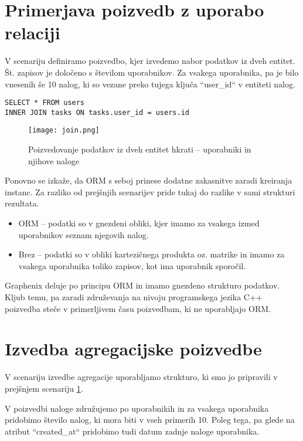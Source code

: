 \documentclass[a4paper,12pt,openright]{book}
\begin{document}
    \section{Primerjava poizvedb z uporabo relaciji}
    \label{join_lbl}

    V scenariju definiramo poizvedbo, kjer izvedemo nabor podatkov iz dveh entitet. Št. zapisov je določeno s številom uporabnikov. Za vsakega uporabnika, pa je bilo vnesenih še 10 nalog, ki so vezane preko tujega ključa ``user\_id`` v entiteti nalog.
    
\begin{verbatim}
SELECT * FROM users 
INNER JOIN tasks ON tasks.user_id = users.id
\end{verbatim}

    \begin{figure}[H]
        \centerline{\texttt{[image: join.png]}}
        \caption{Poizvedovanje podatkov iz dveh entitet hkrati – uporabniki in njihove naloge}
        \label{join}
    \end{figure}

    \noindent
    Ponovno se izkaže, da ORM s seboj prinese dodatne zakasnitve zaradi kreiranja instanc. Za razliko od prejšnjih scenarijev pride tukaj do razlike v sami strukturi rezultata.
    
    \begin{itemize}
        \item ORM – podatki so v gnezdeni obliki, kjer imamo za vsakega izmed uporabnikov seznam njegovih nalog.
        \item Brez – podatki so v obliki kartezičnega produkta oz. matrike in imamo za vsakega uporabnika toliko zapisov, kot ima uporabnik sporočil.
    \end{itemize}

    \noindent
    Graphenix deluje po principu ORM in imamo gnezdeno strukturo podatkov. Kljub temu, pa zaradi združevanja na nivoju programskega jezika C++ poizvedba steče v primerljivem času poizvedbam, ki ne uporabljajo ORM.
    
    \section{Izvedba agregacijske poizvedbe}

    V scenariju izvedbe agregacije uporabljamo strukturo, ki smo jo pripravili v prejšnjem scenariju \ref{join_lbl}.

    V poizvedbi naloge združujemo po uporabnikih in za vsakega uporabnika pridobimo število nalog, ki mora biti v vseh primerih 10. Poleg tega, pa glede na atribut ``created\_at`` pridobimo tudi datum zadnje naloge uporabnika.
    
\end{document}
